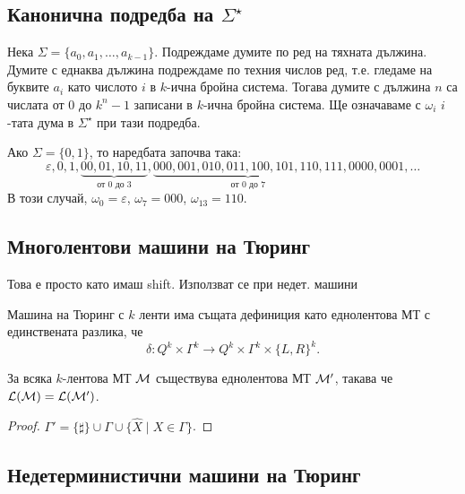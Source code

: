 \subsection*{Канонична подредба на $\Sigma^\star$}

Нека $\Sigma = \{a_0,a_1,\dots,a_{k-1}\}$.
Подреждаме думите по ред на тяхната дължина.
Думите с еднаква дължина подреждаме по техния числов ред, т.е.
гледаме на буквите $a_i$ като числото $i$ в $k$-ична бройна система.
Тогава думите с дължина $n$ са числата от $0$ до $k^n-1$ записани в $k$-ична бройна система.
Ще означаваме с $\omega_i$ $i$-тата дума в $\Sigma^\star$ при тази подредба.

\begin{example}
  Ако $\Sigma = \{0,1\}$, то наредбата започва така:
  \[\varepsilon, 0, 1, \underbrace{00, 01, 10, 11}_{\text{от $0$ до $3$}}, \underbrace{000, 001, 010, 011, 100, 101, 110, 111}_{\text{от $0$ до $7$}}, 0000, 0001, \dots\]
  В този случай, $\omega_0 = \varepsilon$, $\omega_7 = 000$, $\omega_{13} = 110$.
\end{example}

\subsection*{Многолентови машини на Тюринг}

Това е просто като имаш shift.
Използват се при недет. машини

Машина на Тюринг с $k$ ленти има същата дефиниция като еднолентова МТ
с единствената разлика, че
\[\delta: Q^k \times \Gamma^k\to Q^k \times \Gamma^k \times \{L,R\}^k.\]

\begin{prop}
  За всяка $k$-лентова МТ $\mathcal{M}$ съществува еднолентова МТ $\mathcal{M}'$,
  такава че $\mathcal{L}(\mathcal{M}) = \mathcal{L}(\mathcal{M}')$.
\end{prop}
\begin{proof}
  $\Gamma' = \{\sharp\} \cup \Gamma \cup \{\hat{X} \mid X \in \Gamma\}$.
\end{proof}



\subsection*{Недетерминистични машини на Тюринг}

